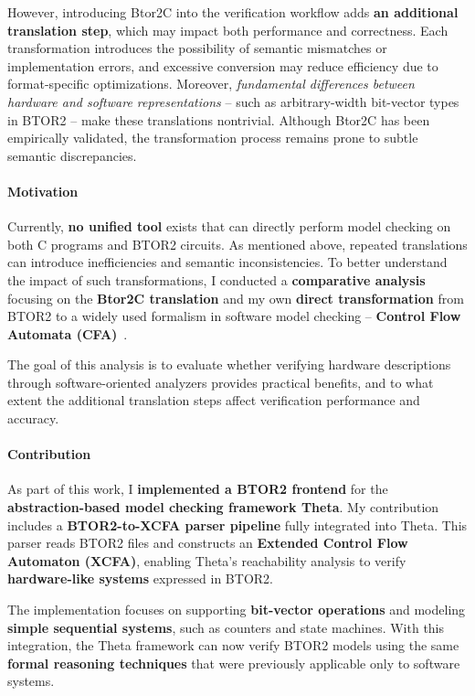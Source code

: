 However, introducing Btor2C into the verification workflow adds \textbf{an additional translation step}, which may impact both performance and correctness. Each transformation introduces the possibility of semantic mismatches or implementation errors, and excessive conversion may reduce efficiency due to format-specific optimizations. Moreover, \textit{fundamental differences between hardware and software representations} -- such as arbitrary-width bit-vector types in BTOR2 -- make these translations nontrivial. Although Btor2C has been empirically validated, the transformation process remains prone to subtle semantic discrepancies.

\paragraph{Motivation} Currently, \textbf{no unified tool} exists that can directly perform model checking on both C programs and BTOR2 circuits. As mentioned above, repeated translations can introduce inefficiencies and semantic inconsistencies. To better understand the impact of such transformations, I conducted a \textbf{comparative analysis} focusing on the \textbf{Btor2C translation} and my own \textbf{direct transformation} from BTOR2 to a widely used formalism in software model checking -- \textbf{Control Flow Automata (CFA)}~\cite{cfa}. 

The goal of this analysis is to evaluate whether verifying hardware descriptions through software-oriented analyzers provides practical benefits, and to what extent the additional translation steps affect verification performance and accuracy.

\paragraph{Contribution} As part of this work, I \textbf{implemented a BTOR2 frontend} for the \textbf{abstraction-based model checking framework Theta}. My contribution includes a \textbf{BTOR2-to-XCFA parser pipeline} fully integrated into Theta. This parser reads BTOR2 files and constructs an \textbf{Extended Control Flow Automaton (XCFA)}, enabling Theta's reachability analysis to verify \textbf{hardware-like systems} expressed in BTOR2.

The implementation focuses on supporting \textbf{bit-vector operations} and modeling \textbf{simple sequential systems}, such as counters and state machines. With this integration, the Theta framework can now verify BTOR2 models using the same \textbf{formal reasoning techniques} that were previously applicable only to software systems.
